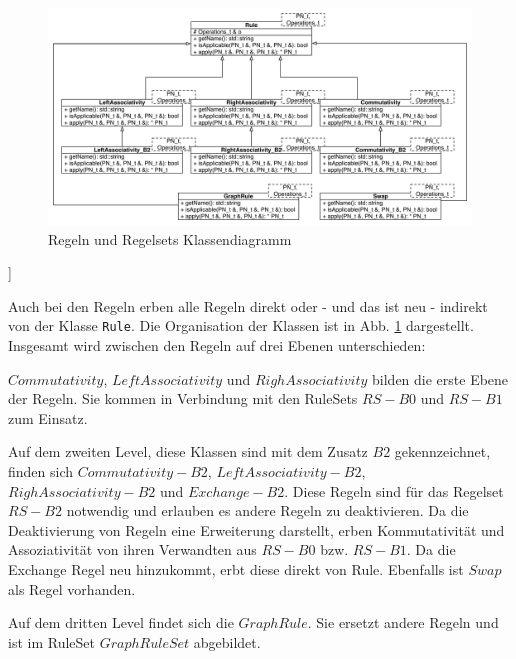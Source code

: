 \begin{figure}[h]
  \centering
  \includegraphics[height=0.8\textwidth , angle=90]{04_Implementierung/Rules.pdf}
  \caption{Regeln und Regelsets Klassendiagramm}
  \label{RuleClassDiagram}
\end{figure}]


Auch bei den Regeln erben alle Regeln direkt oder - und das ist neu - indirekt von der Klasse \texttt{Rule}. Die Organisation der Klassen ist in Abb. \ref{RuleClassDiagram} dargestellt. Insgesamt wird zwischen den Regeln auf drei Ebenen unterschieden: 

$Commutativity$, $LeftAssociativity$ und $RighAssociativity$ bilden die erste Ebene der Regeln. Sie kommen in Verbindung mit den RuleSets $RS-B0$ und $RS-B1$ zum Einsatz.

Auf dem zweiten Level, diese Klassen sind mit dem Zusatz $B2$ gekennzeichnet, finden sich $Commutativity-B2$, $LeftAssociativity-B2$, $RighAssociativity-B2$ und $Exchange-B2$. Diese Regeln sind für das Regelset $RS-B2$ notwendig und erlauben es andere Regeln zu deaktivieren. Da die Deaktivierung von Regeln eine Erweiterung darstellt, erben Kommutativität und Assoziativität von ihren Verwandten aus $RS-B0$ bzw. $RS-B1$. Da die Exchange Regel neu hinzukommt, erbt diese direkt von Rule. Ebenfalls ist $Swap$ als Regel vorhanden.

Auf dem dritten Level findet sich die $GraphRule$. Sie ersetzt andere Regeln und ist im RuleSet $GraphRuleSet$ abgebildet.


